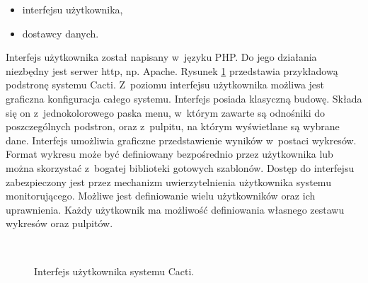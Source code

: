 \begin{itemize}
\item interfejsu użytkownika,
\item dostawcy danych.
\end{itemize}

Interfejs użytkownika został napisany w~języku PHP. Do jego działania
niezbędny jest serwer http, np. Apache. Rysunek
\ref{fig:CactiInterface} przedstawia przykładową podstronę systemu
Cacti. Z~poziomu interfejsu użytkownika możliwa jest graficzna
konfiguracja całego systemu. Interfejs posiada klasyczną
budowę. Składa się on z~jednokolorowego paska menu, w~którym zawarte
są odnośniki do poszczególnych podstron, oraz z~pulpitu, na którym
wyświetlane są wybrane dane. Interfejs umożliwia graficzne
przedstawienie wyników w~postaci wykresów. Format wykresu może być
definiowany bezpośrednio przez użytkownika lub można skorzystać
z~bogatej biblioteki gotowych szablonów. Dostęp do interfejsu
zabezpieczony jest przez mechanizm uwierzytelnienia użytkownika
systemu monitorującego. Możliwe jest definiowanie wielu użytkowników
oraz ich uprawnienia. Każdy użytkownik ma możliwość definiowania
własnego zestawu wykresów oraz pulpitów.

\begin{figure}[h]
\label{fig:CactiInterface}
\caption{Interfejs użytkownika systemu Cacti.}
\begin{center}
\\[0.1cm]
\end{center}
\end{figure}


